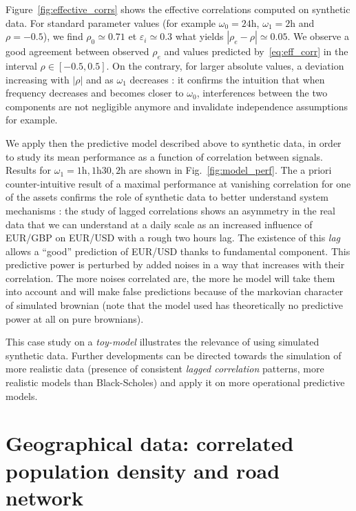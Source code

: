 \documentclass{bmcart}
\begin{document}
Figure~\ref{fig:effective_corrs} shows the effective correlations computed on synthetic data. For standard parameter values (for example $\omega_0=24\textrm{h}$, $\omega_1=2\textrm{h}$ and $\rho=-0.5$), we find $\rho_0\simeq 0.71$ et $\varepsilon_i \simeq 0.3$ what yields $\left| \rho_e - \rho \right|\simeq 0.05$. We observe a good agreement between observed $\rho_e$ and values predicted by~\ref{eq:eff_corr} in the interval $\rho \in [-0.5,0.5]$. On the contrary, for larger absolute values, a deviation increasing with $\left|\rho\right|$ and as $\omega_1$ decreases : it confirms the intuition that when frequency decreases and becomes closer to $\omega_0$, interferences between the two components are not negligible anymore and invalidate independence assumptions for example.



We apply then the predictive model described above to synthetic data, in order to study its mean performance as a function of correlation between signals. Results for $\omega_1 = 1\textrm{h},1\textrm{h}30,2\textrm{h}$ are shown in Fig.~\ref{fig:model_perf}. The a priori counter-intuitive result of a maximal performance at vanishing correlation for one of the assets confirms the role of synthetic data to better understand system mechanisms : the study of lagged correlations shows an asymmetry in the real data that we can understand at a daily scale as an increased influence of EUR/GBP on EUR/USD with a rough two hours lag. The existence of this \emph{lag} allows a ``good'' prediction of EUR/USD thanks to fundamental component. This predictive power is perturbed by added noises in a way that increases with their correlation. The more noises correlated are, the more he model will take them into account and will make false predictions because of the markovian character of simulated brownian (note that the model used has theoretically no predictive power at all on pure brownians).


This case study on a \emph{toy-model} illustrates the relevance of using simulated synthetic data. Further developments can be directed towards the simulation of more realistic data (presence of consistent \emph{lagged correlation} patterns, more realistic models than Black-Scholes) and apply it on more operational predictive models.





\section*{Geographical data: correlated population density and road network}
\end{document}
